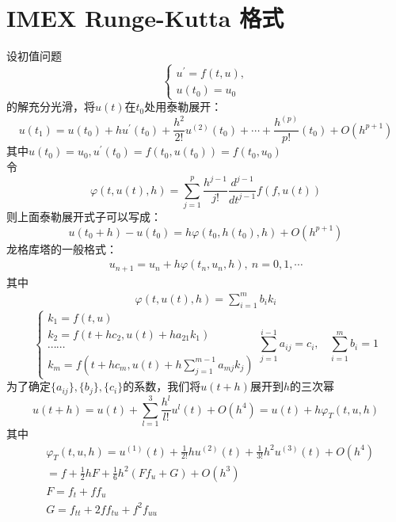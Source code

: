 \documentclass[12pt,a4paper]{article}
\numberwithin{equation}{section}
\begin{document}
\section{IMEX Runge-Kutta 格式}
设初值问题
\begin{equation*}
\begin{cases}
u^{'}=f(t,u),\\
u(t_{0})=u_{0}
\end{cases}
\end{equation*}
的解充分光滑，将$u(t)$在$t_{0}$处用泰勒展开：
\begin{equation*}
u(t_{1})=u(t_{0})+hu^{'}(t_{0})+\frac{h^2}{2!}u^{(2)}(t_{0})+\cdots+\frac{h^{(p)}}{p!}(t_{0})+O(h^{p+1})
\end{equation*}
其中$u(t_{0})=u_{0},u^{'}(t_{0})=f(t_{0},u(t_{0}))=f(t_{0},u_{0})$\\
令
\begin{equation*}
\varphi(t,u(t),h)=\sum_{j=1}^{p}\frac{h^{j-1}}{j!}\frac{d^{j-1}}{dt^{j-1}}f(f,u(t))
\end{equation*}
则上面泰勒展开式子可以写成：
\begin{equation*}
u(t_{0}+h)-u(t_{0})=h\varphi(t_{0},h(t_{0}),h)+O(h^{p+1})
\end{equation*}
龙格库塔的一般格式：
\begin{gather*}
u_{n+1}=u_{n}+h\varphi(t_{n},u_{n},h),~n=0,1,\cdots
\end{gather*}
其中
\begin{gather}
\varphi(t,u(t),h)=\sum_{i=1}^{m}b_{i}k_{i}
\end{gather}
\begin{equation}
\begin{cases}
k_{1}=f(t,u)\\
k_{2}=f(t+hc_{2},u(t)+ha_{21}k_{1})\\
\cdots\cdots\\
k_{m}=f(t+hc_{m},u(t)+h\sum_{j=1}^{m-1}a_{mj}k_{j})
\end{cases}
\sum_{j=1}^{i-1}a_{ij}=c_{i},~~~~\sum_{i=1}^{m}b_{i}=1
\end{equation}
为了确定$\{a_{ij}\},\{b_{j}\},\{c_{i}\}$的系数，我们将$u(t+h)$展开到$h$的三次幂
\begin{equation*}
u(t+h)=u(t)+\sum_{l=1}^{3}\frac{h^l}{l!}u^{l}(t)+O(h^4)=u(t)+h\varphi_{T}(t,u,h)
\end{equation*}
其中
\begin{align*}
&\varphi_{T}(t,u,h)=u^{(1)}(t)+\frac{1}{2!}hu^{(2)}(t)+\frac{1}{3!}h^2u^{(3)}(t)+O(h^4)\\
&=f+\frac{1}{2}hF+\frac{1}{6}h^2(Ff_{u}+G)+O(h^3)\\
&F=f_{t}+ff_{u}\\
&G=f_{tt}+2ff_{tu}+f^2f_{uu}
\end{align*}
\end{document}
